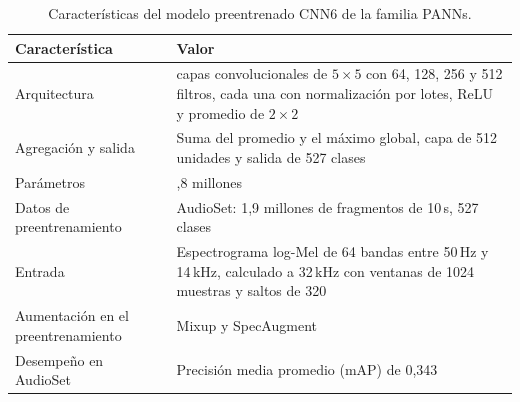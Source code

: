 \begin{table}[htbp]
	\centering
	\caption[Características del modelo preentrenado CNN6]{Características del modelo
		preentrenado CNN6 de la familia PANNs.}
	\label{tab:cnn6}
	\small
	\begin{tabular}{>{\raggedright\arraybackslash}p{4.2cm} >{\raggedright\arraybackslash}p{8.2cm}}
		\toprule
		\textbf{Característica} & \textbf{Valor} \\
		\midrule
		Arquitectura & 4 capas convolucionales de $5 \times 5$ con 64, 128, 256 y 512 filtros, cada una con normalización por lotes, ReLU y promedio de $2 \times 2$ \\
		\addlinespace
		Agregación y salida & Suma del promedio y el máximo global, capa de 512 unidades y salida de 527 clases \\
		\addlinespace
		Parámetros & 4,8 millones \\
		\addlinespace
		Datos de preentrenamiento & AudioSet: 1,9 millones de fragmentos de 10\,s, 527 clases \\
		\addlinespace
		Entrada & Espectrograma log-Mel de 64 bandas entre 50\,Hz y 14\,kHz, calculado a 32\,kHz con ventanas de 1024 muestras y saltos de 320 \\
		\addlinespace
		Aumentación en el preentrenamiento & Mixup y SpecAugment \\
		\addlinespace
		Desempeño en AudioSet & Precisión media promedio (mAP) de 0,343 \\
		\bottomrule
	\end{tabular}
\end{table}



